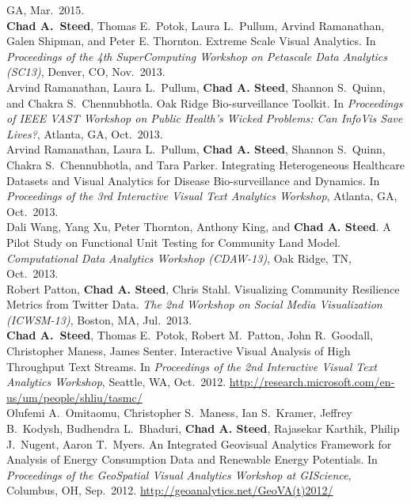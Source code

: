 \documentclass[11pt, letterpaper]{article}
\newcommand{\years}[1]{\marginnote{\scriptsize #1}}
\begin{document}
\begin{sloppypar}
GA, Mar.\ 2015.\\
\years{2013}\textbf{Chad A.\ Steed}, Thomas E.\ Potok, Laura L.\ Pullum,
Arvind Ramanathan, Galen Shipman, and Peter E. Thornton. Extreme Scale Visual Analytics.
In \emph{Proceedings of the 4th SuperComputing Workshop on Petascale Data Analytics (SC13)},
Denver, CO, Nov.\ 2013.\\
\years{2013}Arvind Ramanathan, Laura L.\ Pullum, \textbf{Chad A. Steed},
Shannon S.\ Quinn, and Chakra S.\ Chennubhotla. Oak Ridge Bio-surveillance Toolkit.
In \emph{Proceedings of IEEE VAST Workshop on Public Health's Wicked Problems:
Can InfoVis Save Lives?}, Atlanta, GA, Oct.\ 2013.\\
\years{2013}Arvind Ramanathan, Laura L.\ Pullum, \textbf{Chad A. Steed},
Shannon S.\ Quinn, Chakra S.\ Chennubhotla, and Tara Parker.
Integrating Heterogeneous Healthcare Datasets and Visual Analytics for Disease
Bio-surveillance and Dynamics. In \emph{Proceedings of the 3rd Interactive
Visual Text Analytics Workshop}, Atlanta, GA, Oct.\ 2013.\\
\years{2013}Dali Wang, Yang Xu, Peter Thornton, Anthony King,
and \textbf{Chad A. Steed}. A Pilot Study on Functional Unit Testing for
Community Land Model. \emph{Computational Data Analytics Workshop (CDAW-13)},
Oak Ridge, TN, Oct.\ 2013.\\
\years{2013}Robert Patton, \textbf{Chad A. Steed}, Chris Stahl.
Visualizing Community Resilience Metrics from Twitter Data. \emph{The 2nd Workshop
on Social Media Visualization (ICWSM-13)}, Boston, MA, Jul.\ 2013.\\
\years{2012}\textbf{Chad A.\ Steed}, Thomas E.\ Potok, Robert M.\ Patton,
John R.\ Goodall, Christopher Maness, James Senter.  Interactive Visual Analysis
of High Throughput Text Streams. In \emph{Proceedings of the 2nd Interactive
Visual Text Analytics Workshop}, Seattle, WA, Oct.\ 2012.
\href{http://research.microsoft.com/en-us/um/people/shliu/tasmc/}
{http://research.microsoft.com/en-us/um/people/shliu/tasmc/}\\
\years{2012}Olufemi A.\ Omitaomu, Christopher S.\ Maness, Ian S.\ Kramer,
Jeffrey B.\ Kodysh, Budhendra L.\ Bhaduri, \textbf{Chad A. Steed},
Rajasekar Karthik, Philip J.\ Nugent, Aaron T.\ Myers. An Integrated Geovisual
Analytics Framework for Analysis of Energy Consumption Data and Renewable
Energy Potentials. In \emph{Proceedings of the GeoSpatial Visual Analytics Workshop at
GIScience}, Columbus, OH, Sep.\ 2012.
\href{http://geoanalytics.net/GeoVA(t)2012/}{http://geoanalytics.net/GeoVA(t)2012/}\\

\end{sloppypar}
\end{document}

